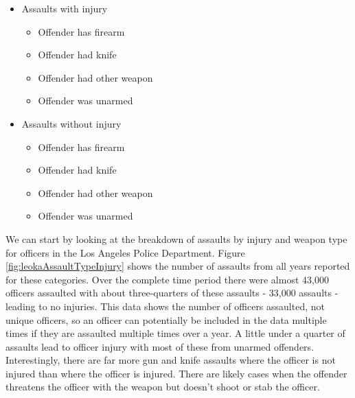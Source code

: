 \documentclass[
]{krantz}
\providecommand{\tightlist}{%
  \setlength{\itemsep}{0pt}\setlength{\parskip}{0pt}}
\begin{document}
\begin{itemize}
\tightlist
\item
  Assaults with injury

  \begin{itemize}
  \tightlist
  \item
    Offender has firearm
  \item
    Offender had knife
  \item
    Offender had other weapon
  \item
    Offender was unarmed
  \end{itemize}
\item
  Assaults without injury

  \begin{itemize}
  \tightlist
  \item
    Offender has firearm
  \item
    Offender had knife
  \item
    Offender had other weapon
  \item
    Offender was unarmed
  \end{itemize}
\end{itemize}

We can start by looking at the breakdown of assaults by
injury and weapon type for officers in the Los Angeles
Police Department. Figure \ref{fig:leokaAssaultTypeInjury}
shows the number of assaults from all years reported for
these categories. Over the complete time period there were
almost 43,000 officers assaulted with about three-quarters
of these assaults - 33,000 assaults - leading to no
injuries. This data shows the number of officers assaulted,
not unique officers, so an officer can potentially be
included in the data multiple times if they are assaulted
multiple times over a year. A little under a quarter of
assaults lead to officer injury with most of these from
unarmed offenders. Interestingly, there are far more gun and
knife assaults where the officer is not injured than where
the officer is injured. There are likely cases when the
offender threatens the officer with the weapon but doesn't
shoot or stab the officer.
\end{document}
